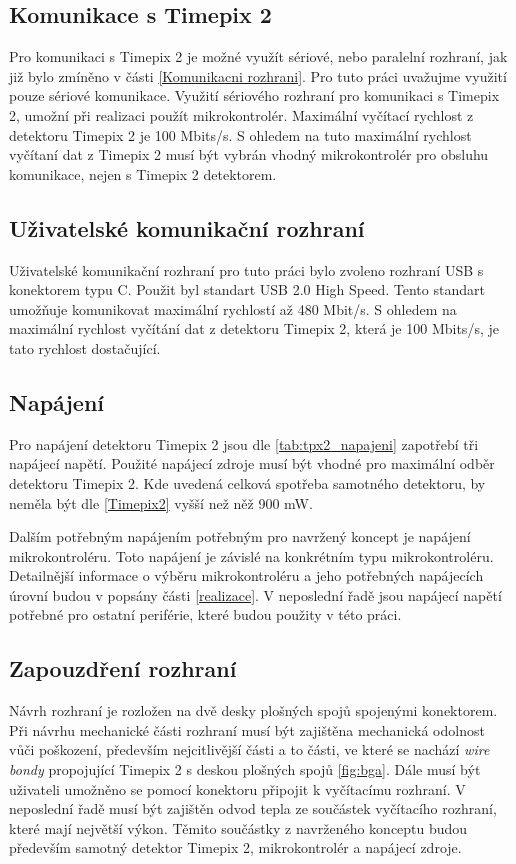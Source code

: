 \subsection{Komunikace s Timepix 2}
Pro komunikaci s Timepix 2 je možné využít sériové, nebo paralelní rozhraní, jak již bylo zmíněno v části \ref{Komunikacni rozhrani}. Pro tuto práci uvažujme využití pouze sériové komunikace. Využití sériového rozhraní pro komunikaci s Timepix 2, umožní při realizaci použít mikrokontrolér. Maximální vyčítací rychlost z detektoru Timepix 2 je 100 Mbits/s. S ohledem na tuto maximální rychlost vyčítaní dat z Timepix 2 musí být vybrán vhodný mikrokontrolér pro obsluhu komunikace, nejen s Timepix 2 detektorem. 

\subsection{Uživatelské komunikační rozhraní}
Uživatelské komunikační rozhraní pro tuto práci bylo zvoleno rozhraní USB s konektorem typu C. Použit byl standart USB 2.0 High Speed. Tento standart umožňuje komunikovat maximální rychlostí až 480 Mbit/s. S ohledem na maximální rychlost vyčítání dat z detektoru Timepix 2, která je 100 Mbits/s, je tato rychlost dostačující. 

\subsection{Napájení}
Pro napájení detektoru Timepix 2 jsou dle \ref{tab:tpx2_napajeni} zapotřebí tři napájecí napětí. Použité napájecí zdroje musí být vhodné pro maximální odběr detektoru Timepix 2. Kde uvedená celková spotřeba samotného detektoru, by neměla být dle \ref{Timepix2} vyšší než něž 900 mW. 
\par Dalším potřebným napájením potřebným pro navržený koncept je napájení mikrokontroléru. Toto napájení je závislé na konkrétním typu mikrokontroléru. Detailnější informace o výběru mikrokontroléru a jeho potřebných napájecích úrovní budou v popsány části \ref{realizace}. V neposlední řadě jsou napájecí napětí potřebné pro ostatní periférie, které budou použity v této práci.

\subsection{Zapouzdření rozhraní}
Návrh rozhraní je rozložen na dvě desky plošných spojů spojenými konektorem. Při návrhu mechanické části rozhraní musí být zajištěna mechanická odolnost vůči poškození, především nejcitlivější části a to části, ve které se nachází \textit{wire bondy} propojující Timepix 2 s deskou plošných spojů \ref{fig:bga}. Dále musí být uživateli umožněno se pomocí konektoru připojit k vyčítacímu rozhraní. V neposlední řadě musí být zajištěn odvod tepla ze součástek vyčítacího rozhraní, které mají největší výkon. Těmito součástky z navrženého konceptu budou především samotný detektor Timepix 2, mikrokontrolér a napájecí zdroje. 
